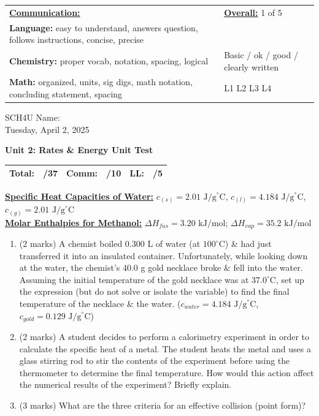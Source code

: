 \documentclass[11pt]{article}
\newcommand{\testheader}[1]{
\noindent
\begin{tabularx}{\textwidth}{|X|m{4.5cm}|}
\hline
\textbf{\underline{Communication:}} & \textbf{\underline{Overall:}} \hfill #1 of 5 \\
\textbf{Language:} easy to understand, answers question, follows instructions, concise, precise & \\
\textbf{Chemistry:} proper vocab, notation, spacing, logical & Basic / ok / good / clearly written \\
\textbf{Math:} organized, units, sig digs, math notation, concluding statement, spacing & \space\space L1 \space\space L2 \space\space L3 \space\space\space\space\space L4 \\
\hline
\end{tabularx}
\vspace{0.4cm}
}
\begin{document}
\testheader{1}

\noindent
SCH4U \hfill Name: \underline{\hspace{5cm}} \\
\indent \hfill Tuesday, April 2, 2025

\begin{center}
    \Large \textbf{Unit 2: Rates \& Energy Unit Test}
\end{center}

\noindent
\begin{tabular}{|l r|l r|l r|}
\hline
Total: & /37 & Comm: & /10 & LL: & /5 \\
\hline
\end{tabular}

\vspace{0.4cm}

\noindent
\underline{\textbf{Specific Heat Capacities of Water:}} \space\space\space\space $c_{(s)} = 2.01\text{ J/g}^\circ\text{C}$, $c_{(l)} = 4.184\text{ J/g}^\circ\text{C}$, $c_{(g)} = 2.01\text{ J/g}^\circ\text{C}$ \\
\underline{\textbf{Molar Enthalpies for Methanol:}} \space\space\space\space\space $\Delta H_{fus} = 3.20\text{ kJ/mol}$; $\Delta H_{vap} = 35.2\text{ kJ/mol}$

\vspace{0.5cm}

\begin{enumerate}[leftmargin=*, label=\arabic*.]
    \item (2 marks) A chemist boiled 0.300 L of water (at $100^\circ\text{C}$) \& had just transferred it into an insulated container. Unfortunately, while looking down at the water, the chemist's 40.0 g gold necklace broke \& fell into the water. Assuming the initial temperature of the gold necklace was at $37.0^\circ\text{C}$, set up the expression (but do not solve or isolate the variable) to find the final temperature of the necklace \& the water. ($c_{water} = 4.184\text{ J/g}^\circ\text{C}$, $c_{gold} = 0.129\text{ J/g}^\circ\text{C}$)
    \vspace{4.5cm}

    \item (2 marks) A student decides to perform a calorimetry experiment in order to calculate the specific heat of a metal. The student heats the metal and uses a glass stirring rod to stir the contents of the experiment before using the thermometer to determine the final temperature. How would this action affect the numerical results of the experiment? Briefly explain.
    \vspace{3.5cm}

    \item (3 marks) What are the three criteria for an effective collision (point form)?
\end{enumerate}
\end{document}
